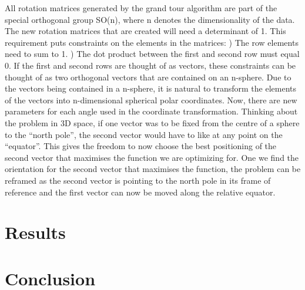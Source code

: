 \documentclass[a4paper,11pt,twoside]{article}
\begin{document}
All rotation matrices generated by the grand tour algorithm are part of the special orthogonal group SO(n), where n denotes the dimensionality of the data. The new rotation matrices that are created will need a determinant of 1. This requirement puts constraints on the elements in the matrices:
) The row elements need to sum to 1.
) The dot product between the first and second row must equal 0.
\newline
If the first and second rows are thought of as vectors, these constraints can be thought of as two orthogonal vectors that are contained on an n-sphere.
\newline
\newline
Due to the vectors being contained in a n-sphere, it is natural to transform the elements of the vectors into n-dimensional spherical polar coordinates. Now, there are new parameters for each angle used in the coordinate transformation. 
\newline
\newline
Thinking about the problem in 3D space, if one vector was to be fixed from the centre of a sphere to the “north pole”, the second vector would have to like at any point on the “equator”. This gives the freedom to now choose the best positioning of the second vector that maximises the function we are optimizing for. One we find the orientation for the second vector that maximises the function, the problem can be reframed as the second vector is pointing to the north pole in its frame of reference and the first vector can now be moved along the relative equator.

\newpage
\section{Results}

\newpage
\section{Conclusion}
\end{document}
